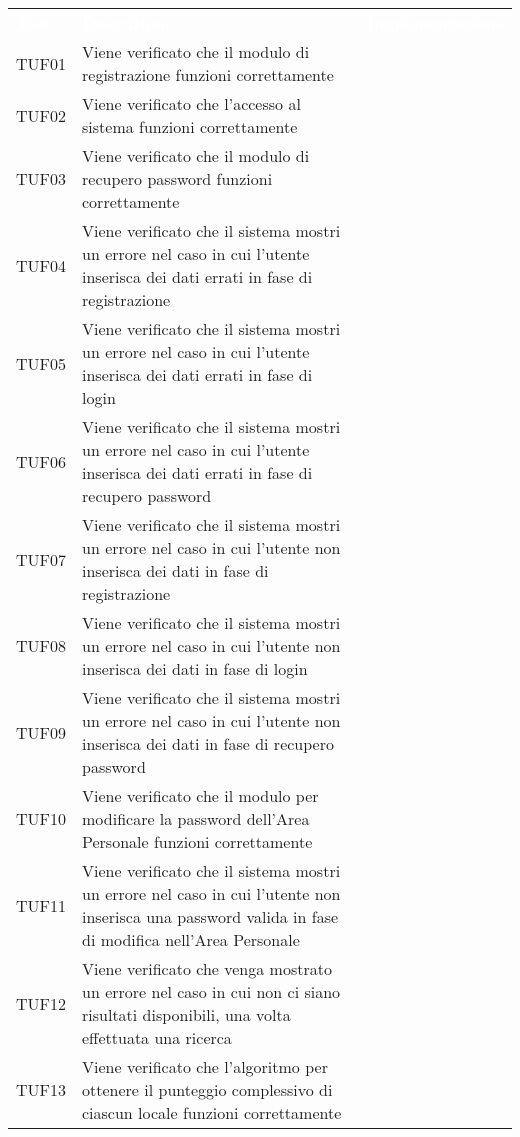 
\renewcommand{\arraystretch}{1.5}
\begin{longtable}{ m{}<{\centering}  m{}<{\centering}  m{}<{\centering} }
	\rowcolor{darkblue}
	\textcolor{white}{\textbf{Test}} &\textcolor{white}{\textbf{Descrizione}} & \textcolor{white}{\textbf{Implementazione}} \\ 

	TUF01 & Viene verificato che il modulo di registrazione funzioni correttamente & \Ni \\
	TUF02 & Viene verificato che l'accesso al sistema funzioni correttamente & \Ni \\
	TUF03 & Viene verificato che il modulo di recupero password funzioni correttamente & \Ni \\
	TUF04 & Viene verificato che il sistema mostri un errore nel caso in cui l'utente inserisca dei dati errati in fase di registrazione & \Ni \\
	TUF05 & Viene verificato che il sistema mostri un errore nel caso in cui l'utente inserisca dei dati errati in fase di login & \Ni \\
	TUF06 & Viene verificato che il sistema mostri un errore nel caso in cui l'utente inserisca dei dati errati in fase di recupero password & \Ni \\
	TUF07 & Viene verificato che il sistema mostri un errore nel caso in cui l'utente non inserisca dei dati in fase di registrazione & \Ni \\
	TUF08 & Viene verificato che il sistema mostri un errore nel caso in cui l'utente non inserisca dei dati in fase di login & \Ni \\
	TUF09 & Viene verificato che il sistema mostri un errore nel caso in cui l'utente non inserisca dei dati in fase di recupero password & \Ni \\
	TUF10 & Viene verificato che il modulo per modificare la password dell'Area Personale funzioni correttamente & \Ni \\
	TUF11 & Viene verificato che il sistema mostri un errore nel caso in cui l'utente non inserisca una password valida in fase di modifica nell'Area Personale & \Ni \\
	TUF12 & Viene verificato che venga mostrato un errore nel caso in cui non ci siano risultati disponibili, una volta effettuata una ricerca & \Ni \\
	TUF13 & Viene verificato che l'algoritmo per ottenere il punteggio complessivo di ciascun locale funzioni correttamente & \Ni \\

\end{longtable}
